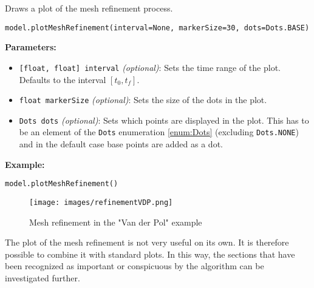 \documentclass[12pt]{article}
\begin{document}
\begin{mdframed}[backgroundcolor=gray!10, roundcorner=10pt,
		linewidth=1pt]

	Draws a plot of the mesh refinement process.

	\begin{lstlisting}
model.plotMeshRefinement(interval=None, markerSize=30, dots=Dots.BASE)
		\end{lstlisting}
	\label{plotMeshRefinement}
	\textbf{Parameters:}
	\begin{itemize}
		\item \texttt{[float, float] interval} \emph{(optional)}: Sets
		      the time range of the plot. Defaults to the interval $[t_0, t_f]$.

		\item \texttt{float markerSize} \emph{(optional)}: Sets the
		      size of the dots in the plot.

		\item \texttt{Dots dots} \emph{(optional)}: Sets which points
		      are displayed in the plot. This has to be an element of the \texttt{Dots}
		      enumeration \eqref{enum:Dots} (excluding \texttt{Dots.NONE}) and in the default
		      case base points are added as a dot.
	\end{itemize}

	\textbf{Example:}
	\begin{lstlisting}
model.plotMeshRefinement()
\end{lstlisting}
	\begin{figure}[H]
		\centering
		\texttt{[image: images/refinementVDP.png]}
		\caption{Mesh refinement in the "Van der Pol" example}
		\label{fig:vdp}
	\end{figure}
\end{mdframed}

The plot of the mesh refinement is not very useful on its own. It is therefore
possible to combine it with standard plots. In this way, the sections that have
been recognized as important or conspicuous by the  algorithm can be
investigated further.
\end{document}
